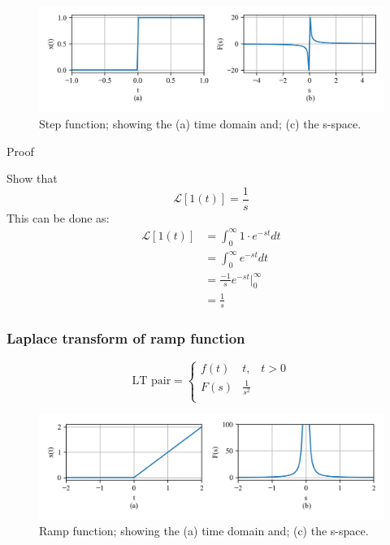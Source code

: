 \documentclass[12pt,letter]{article}
\numberwithin{ex}{section} %
\numberwithin{re}{section} %
\newcommand{\gr}[1]{\textcolor[rgb]{0.00,0.50,0.00}{#1}}
\newcommand{\Laplace}[1]{\ensuremath{\mathcal{L}{\left[#1\right]}}}
\numberwithin{equation}{section}	%
\begin{document}
		\begin{figure}[H]
			\centering
			\includegraphics[width=6.5in]{../figures/T_and_S_space_step_function}
			\caption{Step function; showing the (a) time domain and; (c) the s-space.}
			\label{fig:T_and_S_space_step_function}
		\end{figure}


\begin{mdframed}[middlelinewidth=0.5mm]
\begin{center}
\gr{Proof}
\end{center}
Show that
\begin{equation}
\Laplace{1(t)} = \frac{1}{s}
\end{equation}
This can be done as:
\begin{align}
	\Laplace{1(t)} &=  \int_{0}^{\infty}1 \cdot e^{-st} dt \\ \nonumber
	&= \int_{0}^{\infty}e^{-st} dt  \\ \nonumber
&= \frac{-1}{s}e^{-st}\bigg|^\infty_0 \\ \nonumber
&= \frac{1}{s} 
\end{align}
\end{mdframed}

		\subsubsection{Laplace transform of ramp function}

		\begin{equation}
		\text{LT pair} =
			\begin{cases}
			f(t) & t, \; \; \; t>0 \\
			F(s) & \frac{1}{s^2} \\
			\end{cases}
		\end{equation}

		\begin{figure}[H]
			\centering
			\includegraphics[width=6.5in]{../figures/T_and_S_space_ramp_function}
			\caption{Ramp function; showing the (a) time domain and; (c) the s-space.}
			\label{fig:T_and_S_space_ramp_function}
		\end{figure}
\end{document}
